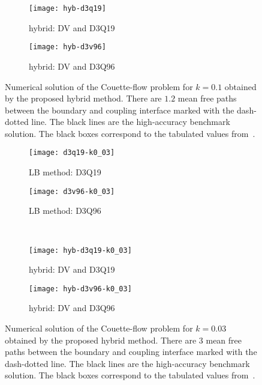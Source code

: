 \documentclass{elsarticle} %
\begin{document}
\begin{figure}
    \centering
    \begin{subfigure}[b]{0.5\textwidth}
        \texttt{[image: hyb-d3q19]}
        \caption{hybrid: DV and D3Q19}
        \label{fig:hyb:d3q19}
    \end{subfigure}%
    \begin{subfigure}[b]{0.5\textwidth}
        \texttt{[image: hyb-d3v96]}
        \caption{hybrid: DV and D3Q96}
        \label{fig:hyb:d3q96}
    \end{subfigure}
    \caption{
        Numerical solution of the Couette-flow problem for \(k=0.1\) obtained by the proposed hybrid method.
        There are \(1.2\) mean free paths between the boundary and coupling interface marked with the dash-dotted line.
        The black lines are the high-accuracy benchmark solution.
        The black boxes correspond to the tabulated values from~\cite{Luo2016}.
    }\label{fig:hybrid}
\end{figure}

\begin{figure}
    \centering
    \begin{subfigure}[b]{0.5\textwidth}
        \texttt{[image: d3q19-k0\_03]}
        \caption{LB method: D3Q19}
        \label{fig:d3q19-k0_03}
    \end{subfigure}%
    \begin{subfigure}[b]{0.5\textwidth}
        \texttt{[image: d3v96-k0\_03]}
        \caption{LB method: D3Q96}
        \label{fig:d3q96-k0_03}
    \end{subfigure}\\
    \begin{subfigure}[b]{0.5\textwidth}
        \texttt{[image: hyb-d3q19-k0\_03]}
        \caption{hybrid: DV and D3Q19}
        \label{fig:hyb:d3q19-k0_03}
    \end{subfigure}%
    \begin{subfigure}[b]{0.5\textwidth}
        \texttt{[image: hyb-d3v96-k0\_03]}
        \caption{hybrid: DV and D3Q96}
        \label{fig:hyb:d3q96-k0_03}
    \end{subfigure}
    \caption{
        Numerical solution of the Couette-flow problem for \(k=0.03\) obtained by the proposed hybrid method.
        There are \(3\) mean free paths between the boundary and coupling interface marked with the dash-dotted line.
        The black lines are the high-accuracy benchmark solution.
        The black boxes correspond to the tabulated values from~\cite{Luo2016}.
    }\label{fig:k0_03}
\end{figure}
\end{document}
